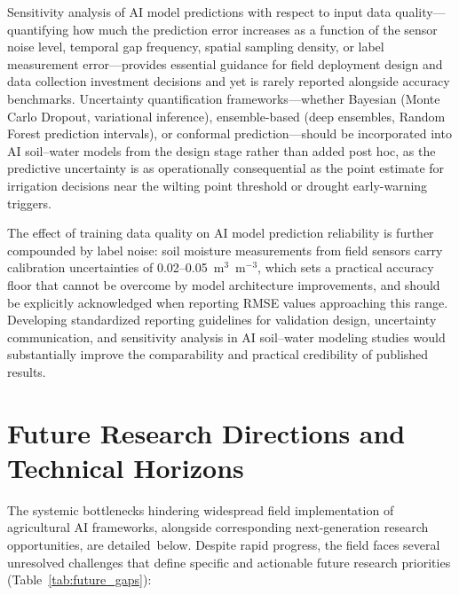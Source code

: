 \documentclass[land,review,accept,pdftex,oneauthor]{Definitions/mdpi}
\begin{document}
{Sensitivity analysis of AI model predictions with respect to input data quality---quantifying how much the prediction error increases as a function of the sensor noise level, temporal gap frequency, spatial sampling density, or label measurement error---provides essential guidance for field deployment design and data collection investment decisions and yet is rarely reported alongside accuracy benchmarks. Uncertainty quantification frameworks---whether Bayesian (Monte Carlo Dropout, variational inference), ensemble-based (deep ensembles, Random Forest prediction intervals), or conformal prediction---should be incorporated into AI soil--water models from the design stage rather than added post hoc, as the predictive uncertainty is as operationally consequential as the point estimate for irrigation decisions near the wilting point threshold or drought early-warning triggers.} 

{The effect of training data quality on AI model prediction reliability is further compounded by label noise: soil moisture measurements from field sensors carry calibration uncertainties of 0.02--0.05~m$^3$~m$^{-3}$, which sets a practical accuracy floor that cannot be overcome by model architecture improvements, and should be explicitly acknowledged when reporting RMSE values approaching this range. Developing standardized reporting guidelines for validation design, uncertainty communication, and sensitivity analysis in AI soil--water modeling studies would substantially improve the comparability and practical credibility of published results.}

\section{{Future Research Directions and Technical Horizons}}\label{sec9}

The systemic bottlenecks hindering widespread field implementation of agricultural AI frameworks, alongside corresponding next-generation research opportunities, are detailed~below. Despite rapid progress, the field faces several unresolved challenges that define
specific and actionable future research priorities (Table~\ref{tab:future_gaps}):
\end{document}
